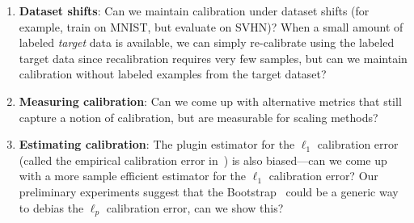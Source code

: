 \begin{enumerate}
\item \textbf{Dataset shifts}: Can we maintain calibration under dataset shifts (for example, train on MNIST, but evaluate on SVHN)? When a small amount of labeled \emph{target} data is available, we can simply re-calibrate using the labeled target data since recalibration requires very few samples, but can we maintain calibration without labeled examples from the target dataset?
\item \textbf{Measuring calibration}: Can we come up with alternative metrics that still capture a notion of calibration, but are measurable for scaling methods?
\item \textbf{Estimating calibration}: The plugin estimator for the $\ell_1$ calibration error (called the empirical calibration error in~\cite{guo2017calibration, nixon2019calibration}) is also biased---can we come up with a more sample efficient estimator for the $\ell_1$ calibration error? Our preliminary experiments suggest that the Bootstrap~\cite{efron1979bootstrap} could be a generic way to debias the $\ell_p$ calibration error, can we show this?
\end{enumerate}

